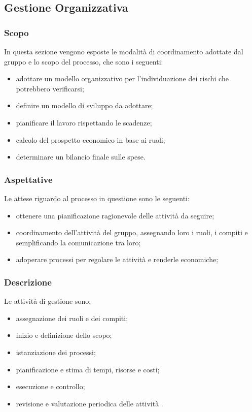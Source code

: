 \subsection{Gestione Organizzativa}
\subsubsection{Scopo}
In questa sezione vengono esposte le modalità  di coordinamento adottate dal gruppo e lo scopo del processo, che sono i seguenti:
\begin{itemize}
\item adottare un modello organizzativo per l'individuazione dei rischi che potrebbero verificarsi;
\item definire un modello di sviluppo da adottare;
\item pianificare il lavoro rispettando le scadenze;
\item calcolo del prospetto economico in base ai ruoli;
\item determinare un bilancio finale sulle spese.

\end{itemize}
\subsubsection{Aspettative}
Le attese riguardo al processo in questione sono le seguenti: 
\begin{itemize}
\item ottenere una pianificazione ragionevole delle attività da seguire;
\item coordinamento dell'attività  del gruppo, assegnando loro i ruoli, i compiti e semplificando la comunicazione tra loro;
\item adoperare processi per regolare le attività  e renderle economiche;

\end{itemize}

\subsubsection{Descrizione}
Le attività  di gestione sono: 
\begin{itemize}
\item assegnazione dei ruoli e dei compiti;
\item inizio e definizione dello scopo;
\item istanziazione dei processi;
\item pianificazione e stima di tempi, risorse e costi;
\item esecuzione e controllo;
\item revisione e valutazione periodica delle attività .
\end{itemize}

